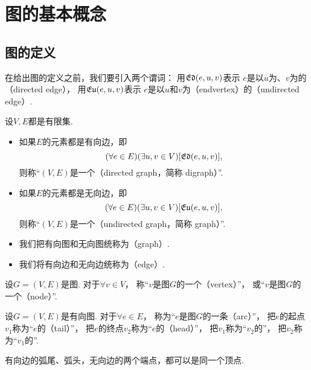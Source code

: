 \section{图的基本概念}
\subsection{图的定义}
在给出图的定义之前，我们要引入两个谓词：
用\(\mathfrak{Ed}(e,u,v)\)表示
\(e\)是以\(u\)为、\(v\)为的（directed edge），
用\(\mathfrak{Eu}(e,u,v)\)表示
\(e\)是以\(u\)和\(v\)为（endvertex）的（undirected edge）.

\begin{definition}
设\(V,E\)都是有限集.
\begin{itemize}
	\item 如果\(E\)的元素都是有向边，即\begin{equation*}
		(\forall e \in E)
		(\exists u,v \in V)
		[\mathfrak{Ed}(e,u,v)],
	\end{equation*}
	则称“\((V,E)\)是一个（directed graph，简称 digraph）”.

	\item 如果\(E\)的元素都是无向边，即\begin{equation*}
		(\forall e \in E)
		(\exists u,v \in V)
		[\mathfrak{Eu}(e,u,v)],
	\end{equation*}
	则称“\((V,E)\)是一个（undirected graph，简称 graph）”.

	\item 我们把有向图和无向图统称为（graph）.

	\item 我们将有向边和无向边统称为（edge）.
\end{itemize}
\end{definition}

\begin{definition}
设\(G = (V,E)\)是图.
对于\(\forall v \in V\)，
称“\(v\)是图\(G\)的一个（vertex）”，
或“\(v\)是图\(G\)的一个（node）”.
\end{definition}

\begin{definition}
设\(G = (V,E)\)是有向图.
对于\(\forall e \in E\)，
称为“\(e\)是图\(G\)的一条（arc）”，
把\(e\)的起点\(v_1\)称为“\(e\)的（tail）”，
把\(e\)的终点\(v_2\)称为“\(e\)的（head）”，
把\(v_1\)称为“\(v_2\)的”，
把\(v_2\)称为“\(v_1\)的”.
\end{definition}
\begin{remark}
有向边的弧尾、弧头，无向边的两个端点，都可以是同一个顶点.
\end{remark}

